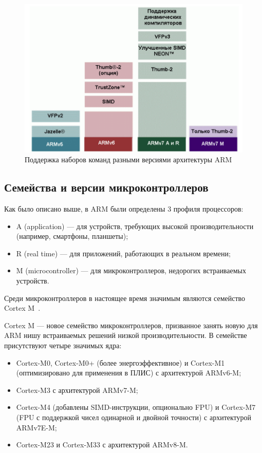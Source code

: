 \documentclass[12pt, oneside]{altsu-report}
\begin{document}
\begin{figure}[!ht]
    \centering
    \includegraphics[scale=0.75]{Thumb-2.png}
    \caption{Поддержка наборов команд разными версиями архитектуры ARM}
    \label{fig:thumb-2}
\end{figure}

\subsection{Семейства и версии микроконтроллеров}

Как было описано выше, в ARM были определены 3 профиля процессоров:

\begin{itemize}
    \item A (application) --- для устройств, требующих высокой производительности (например, смартфоны, планшеты);

    \item R (real time) --- для приложений, работающих в реальном времени;

    \item M (microcontroller) --- для микроконтроллеров, недорогих встраиваемых уст\-ройств.
\end{itemize}

Среди микроконтроллеров в настоящее время значимым являются семейство Cortex M~\cite{wikiRUARM}.

Cortex M --- новое семейство микроконтроллеров, призванное занять новую для ARM нишу встраиваемых решений низкой производительности. В семействе присутствуют четыре значимых ядра:

\begin{itemize}
    \item Cortex-M0, Cortex-M0+ (более энергоэффективное) и Cortex-M1 (оптимизировано для применения в ПЛИС) с архитектурой ARMv6-M;

    \item Cortex-M3 с архитектурой ARMv7-M;

    \item Cortex-M4 (добавлены SIMD-инструкции, опционально FPU) и Cortex-M7 (FPU с поддержкой чисел одинарной и двойной точности) с архитектурой ARMv7E-M;

    \item Cortex-M23 и Cortex-M33 с архитектурой ARMv8-M.
\end{itemize}
\end{document}
